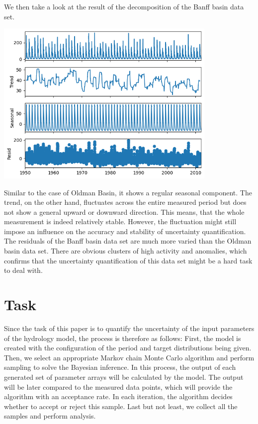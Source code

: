 We then take a look at the result of the decomposition of the Banff basin data set.
\begin{center}
\includegraphics[width=0.8\textwidth]{figures/dataset_time_series/Banff.png}
\end{center}
Similar to the case of Oldman Basin, it shows a regular seasonal component. The trend, on the other hand, fluctuates across the entire measured period but does not show a general upward or downward direction. This means, that the whole measurement is indeed relatively stable. However, the fluctuation might still impose an influence on the accuracy and stability of uncertainty quantification. The residuals of the Banff basin data set are much more varied than the Oldman basin data set. There are obvious clusters of high activity and anomalies, which confirms that the uncertainty quantification of this data set might be a hard task to deal with.


\section{Task}
Since the task of this paper is to quantify the uncertainty of the input parameters of the hydrology model, the process is therefore as follows: First, the model is created with the configuration of the period and target distributions being given. Then, we select an appropriate Markov chain Monte Carlo algorithm and perform sampling to solve the Bayesian inference. In this process, the output of each generated set of parameter arrays will be calculated by the model. The output will be later compared to the measured data points, which will provide the algorithm with an acceptance rate. In each iteration, the algorithm decides whether to accept or reject this sample. Last but not least, we collect all the samples and perform analysis.

